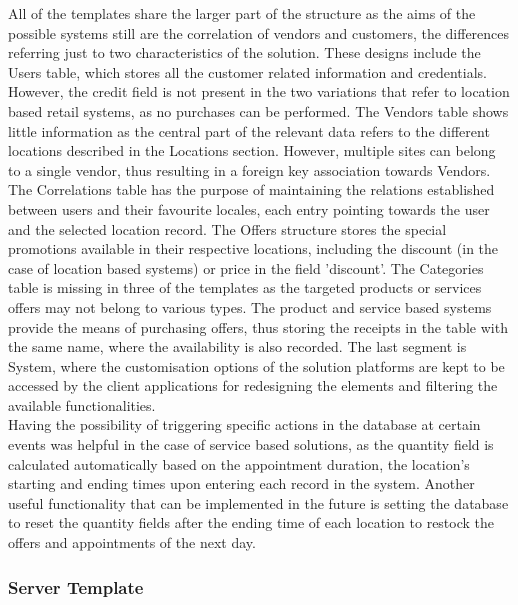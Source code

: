 All of the templates share the larger part of the structure as the aims of the possible systems still are the correlation of vendors and customers, the differences referring just to two characteristics of the solution. These designs include the Users table, which stores all the customer related information and credentials. However, the credit field is not present in the two variations that refer to location based retail systems, as no purchases can be performed. The Vendors table shows little information as the central part of the relevant data refers to the different locations described in the Locations section. However, multiple sites can belong to a single vendor, thus resulting in a foreign key association towards Vendors. The Correlations table has the purpose of maintaining the relations established between users and their favourite locales, each entry pointing towards the user and the selected location record. The Offers structure stores the special promotions available in their respective locations, including the discount (in the case of location based systems) or price in the field 'discount'. The Categories table is missing in three of the templates as the targeted products or services offers may not belong to various types. The product and service based systems provide the means of purchasing offers, thus storing the receipts in the table with the same name, where the availability is also recorded. The last segment is System, where the customisation options of the solution platforms are kept to be accessed by the client applications for redesigning the elements and filtering the available functionalities.\\

Having the possibility of triggering specific actions in the database at certain events was helpful in the case of service based solutions, as the quantity field is calculated automatically based on the appointment duration, the location's starting and ending times upon entering each record in the system. Another useful functionality that can be implemented in the future is setting the database to reset the quantity fields after the ending time of each location to restock the offers and appointments of the next day.\\

\subsubsection{Server Template}

